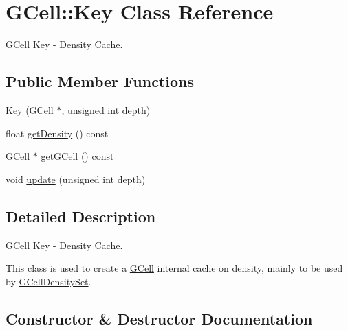 \hypertarget{classKatabatic_1_1GCell_1_1Key}{}\section{G\+Cell\+:\+:Key Class Reference}
\label{classKatabatic_1_1GCell_1_1Key}


\mbox{\hyperlink{classKatabatic_1_1GCell}{G\+Cell}} \mbox{\hyperlink{classKatabatic_1_1GCell_1_1Key}{Key}} -\/ Density Cache.  


\subsection*{Public Member Functions}
\begin{DoxyCompactItemize}
\item 
\mbox{\hyperlink{classKatabatic_1_1GCell_1_1Key_a6efdb05badcc81d3d3013ce4730bbe6e}{Key}} (\mbox{\hyperlink{classKatabatic_1_1GCell}{G\+Cell}} $\ast$, unsigned int depth)
\item 
float \mbox{\hyperlink{classKatabatic_1_1GCell_1_1Key_a9f45c741b4c738e833fe66fe125592b7}{get\+Density}} () const
\item 
\mbox{\hyperlink{classKatabatic_1_1GCell}{G\+Cell}} $\ast$ \mbox{\hyperlink{classKatabatic_1_1GCell_1_1Key_a819cf639562a031a1e2e061fe1293d66}{get\+G\+Cell}} () const
\item 
void \mbox{\hyperlink{classKatabatic_1_1GCell_1_1Key_a1b9cfb06a645d2b0d93024bc6ff82e9e}{update}} (unsigned int depth)
\end{DoxyCompactItemize}


\subsection{Detailed Description}
\mbox{\hyperlink{classKatabatic_1_1GCell}{G\+Cell}} \mbox{\hyperlink{classKatabatic_1_1GCell_1_1Key}{Key}} -\/ Density Cache. 

This class is used to create a \mbox{\hyperlink{classKatabatic_1_1GCell}{G\+Cell}} internal cache on density, mainly to be used by \mbox{\hyperlink{classKatabatic_1_1GCellDensitySet}{G\+Cell\+Density\+Set}}. 

\subsection{Constructor \& Destructor Documentation}
\mbox{\label{classKatabatic_1_1GCell_1_1Key_a6efdb05badcc81d3d3013ce4730bbe6e}} 
